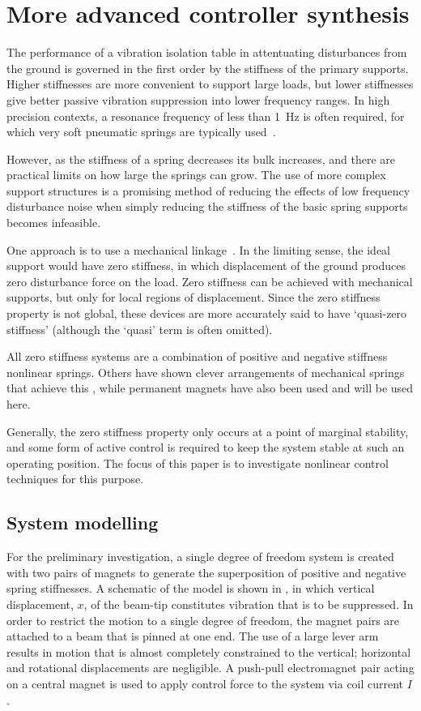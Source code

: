 \section{More advanced controller synthesis}

The performance of a vibration isolation table in attentuating
disturbances from the ground is governed in the first order by the
stiffness of the primary supports. Higher stiffnesses are more
convenient to support large loads, but lower stiffnesses give better
passive vibration suppression into lower frequency ranges. In high
precision contexts, a resonance frequency of less than \SI{1}{Hz} is
often required, for which very soft pneumatic springs are typically
used~\cite{kawashima2007}.

However, as the stiffness of a spring decreases its bulk increases,
and there are practical limits on how large the springs can
grow. The use of more complex support structures is a promising method of
reducing the effects of low frequency disturbance noise when simply
reducing the stiffness of the basic spring supports becomes
infeasible.

One approach is to use a mechanical linkage~\cite{winterflood2001}. In
the limiting sense, the ideal support would have zero stiffness, in
which displacement of the ground produces zero disturbance force on
the load. Zero stiffness can be achieved with mechanical supports, but
only for local regions of displacement. Since the zero stiffness
property is not global, these devices are more accurately said to have
`quasi-zero stiffness' (although the `quasi' term is often omitted).

All zero stiffness systems are a combination of positive and negative
stiffness nonlinear springs. Others have shown clever arrangements of
mechanical springs that achieve this
\cite{alabuzhev1989,carrella2007,lee2007}, while permanent magnets
have also been used \cite{robertson2006,nijsse2001} and will be used
here.

Generally, the zero stiffness property only occurs at a point of
marginal stability, and some form of active control is required to
keep the system stable at such an operating position.  The focus of
this paper is to investigate nonlinear control techniques for this
purpose.

\subsection{System modelling}

For the preliminary investigation, a single degree of freedom system
is created with two pairs of magnets to generate the superposition of
positive and negative spring stiffnesses. A schematic of the model is
shown in , in which vertical displacement, $x$, of
the beam-tip constitutes vibration that is to be suppressed. In order
to restrict the motion to a single degree of freedom, the magnet pairs
are attached to a beam that is pinned at one end. The use of a large
lever arm results in motion that is almost completely constrained to
the vertical; horizontal and rotational displacements are
negligible. A push-pull electromagnet pair acting on a central magnet
is used to apply control force to the system via coil current $I$.

